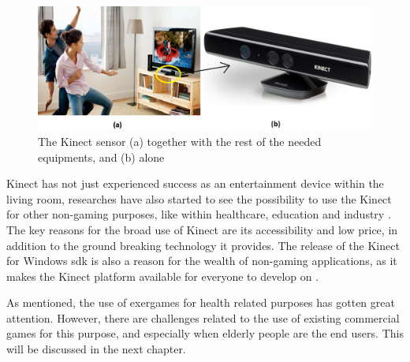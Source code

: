 \begin{figure} 
\centering
\includegraphics[scale=0.36]{sensorandtv}
\caption[The Kinect sensor]{The Kinect sensor (a) together with the rest of the needed equipments, and (b) alone}
\label{kinectsensor}
\end{figure} 
 
Kinect has not just experienced success as an entertainment device within the living room, researches have also started to see the possibility to use the Kinect for other non-gaming purposes, like within healthcare, education and industry \cite{microsoftnews}. The key reasons for the broad use of Kinect are its accessibility and low price, in addition to the ground breaking technology it provides. The release of the Kinect for Windows \ac{sdk} is also a reason for the wealth of non-gaming applications, as it makes the Kinect platform available for everyone to develop on \cite{microsoftnews}. 

As mentioned, the use of exergames for health related purposes has gotten great attention. However, there are challenges related to the use of existing commercial games for this purpose, and especially when elderly people are the end users. This will be discussed in the next chapter. 
